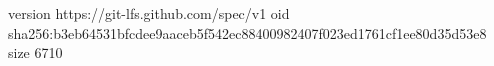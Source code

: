 version https://git-lfs.github.com/spec/v1
oid sha256:b3eb64531bfcdee9aaceb5f542ec88400982407f023ed1761cf1ee80d35d53e8
size 6710
